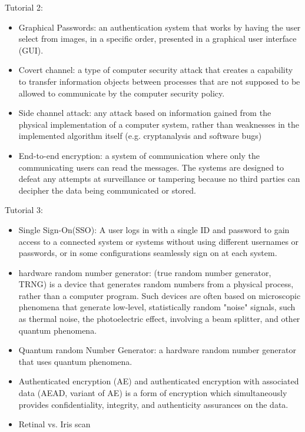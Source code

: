 \documentclass[12pt]{article}
\theoremstyle{definition}
\begin{document}
Tutorial 2:\\
\begin{itemize}
  \item Graphical Passwords: an authentication system that works by having the user select from images, in a specific order, presented in a graphical user interface (GUI).
  \item Covert channel:  a type of computer security attack that creates a capability to transfer information objects between processes that are not supposed to be allowed to communicate by the computer security policy.
  \item Side channel attack: any attack based on information gained from the physical implementation of a computer system, rather than weaknesses in the implemented algorithm itself (e.g. cryptanalysis and software bugs)
  \item End-to-end encryption: a system of communication where only the communicating users can read the messages. The systems are designed to defeat any attempts at surveillance or tampering because no third parties can decipher the data being communicated or stored.
\end{itemize}
Tutorial 3:\\
\begin{itemize}
  \item Single Sign-On(SSO): A user logs in with a single ID and password to gain access to a connected system or systems without using different usernames or passwords, or in some configurations seamlessly sign on at each system.
  \item hardware random number generator: (true random number generator, TRNG) is a device that generates random numbers from a physical process, rather than a computer program. Such devices are often based on microscopic phenomena that generate low-level, statistically random "noise" signals, such as thermal noise, the photoelectric effect, involving a beam splitter, and other quantum phenomena.
  \item Quantum random Number Generator: a hardware random number generator that uses quantum phenomena.
  \item Authenticated encryption (AE) and authenticated encryption with associated data (AEAD, variant of AE) is a form of encryption which simultaneously provides confidentiality, integrity, and authenticity assurances on the data. 
  \item Retinal vs. Iris scan
\end{itemize}
\end{document}
